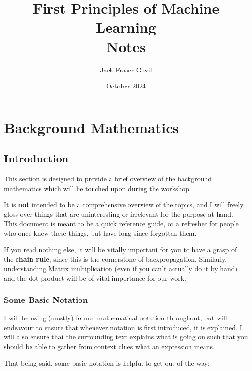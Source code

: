 \documentclass[a4paper,openany,11pt]{book}
\title{First Principles of Machine Learning \\ Notes}
\author{Jack Fraser-Govil}
\date{October 2024}
\begin{document}
	\maketitle

	\setcounter{tocdepth}{1}
	{\tableofcontents{}}	

	\part{Background Mathematics}


		\chapter{Introduction}

			{\large This section is designed to provide a brief overview of the background mathematics which will be touched upon during the workshop.

			It is \textbf{not} intended to be a comprehensive overview of the topics, and I will freely gloss over things that are uninteresting or irrelevant for the purpose at hand. This document is meant to be a quick reference guide, or a refresher for people who once knew these things, but have long since forgotten them. 

			If you read nothing else, it will be vitally important for you to have a grasp of the \textbf{chain rule}, since this is the cornerstone of backpropagation. Similarly, understanding Matrix multiplication (even if you can't actually do it by hand) and the dot product will be of vital importance for our work.}

			\section{Some Basic Notation}

				I will be using (mostly) formal mathematical notation throughout, but will endeavour to ensure that whenever notation is first introduced,  it is explained. I will also ensure that the surrounding text explains what is going on such that you should be able to gather from context clues what an expression means. 

				That being said, some basic notation is helpful to get out of the way:
\end{document}
